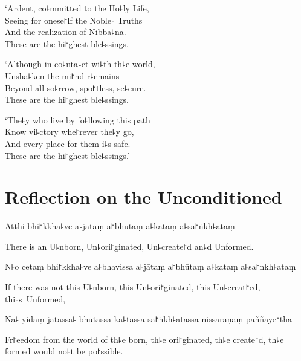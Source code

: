 \clearpage

`Ardent, co꜕mmitted to the Ho꜕ly Life,\\%
Seeing for onese꜓lf the Noble꜕ Truths\\
And the realization of Nibbā꜕na.\\
These are the hi꜓ghest ble꜕ssings.

`Although in co꜕nta꜕ct wi꜕th th꜕e world,\\
Unsha꜕ken the mi꜓nd r꜕emains\\
Beyond all so꜕rrow, spo꜓tless, se꜕cure.\\
These are the hi꜓ghest ble꜕ssings.

`The꜕y who live by fo꜕llowing this path\\
Know vi꜕ctory whe꜓rever the꜕y go,\\
And every place for them i꜕s safe.\\
These are the hi꜓ghest ble꜕ssings.'

\chapter[The Unconditioned]{Reflection on the Unconditioned}%


\begin{leader}
\end{leader}

Atthi bhi꜓kkha꜕ve a꜕jātaṃ a꜓bhūtaṃ a꜕kataṃ a꜕sa꜓ṅkh꜕ataṃ

\begin{english}
  There is an U꜕nborn, Un꜕ori꜓ginated, Un꜕create꜓d an꜕d Unformed.
\end{english}

N꜕o cetaṃ bhi꜓kkha꜕ve a꜕bhavissa a꜕jātaṃ a꜓bhūtaṃ a꜕kataṃ a꜕sa꜓nkh꜕ataṃ

\begin{english}
  If there was not this U꜕nborn, this Un꜕ori꜓ginated, this Un꜕creat꜓ed, thi꜕s~Unformed,
\end{english}

Na꜕ yidaṃ jātassa꜕ bhūtassa ka꜕tassa sa꜓ṅkh꜕atassa nissaraṇaṃ paññāye꜓tha

\begin{english}
  Fr꜓eedom from the world of th꜕e born, th꜕e ori꜓ginated, th꜕e create꜓d, th꜕e formed would no꜕t be po꜓ssible.
\end{english}

